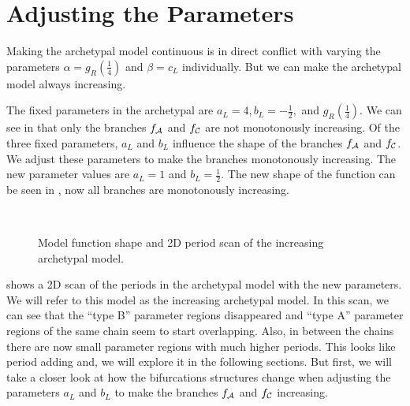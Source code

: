 \section{Adjusting the Parameters}
\label{sec:add.parameters}

Making the archetypal model continuous is in direct conflict with varying the parameters $\alpha = g_R\left(\frac{1}{4}\right)$ and $\beta = c_L$ individually.
But we can make the archetypal model always increasing.

The fixed parameters in the archetypal are $a_L = 4, b_L = -\frac{1}{2},$ and $g_R\left(\frac{1}{4}\right)$.
We can see in  that only the branches $f_{\mathcal{A}}$ and $f_{\mathcal{C}}$ are not monotonously increasing.
Of the three fixed parameters, $a_L$ and $b_L$ influence the shape of the branches $f_{\mathcal{A}}$ and $f_{\mathcal{C}}$.
We adjust these parameters to make the branches monotonously increasing.
The new parameter values are $a_L = 1$ and $b_L = \frac{1}{2}$.
The new shape of the function can be seen in , now all branches are monotonously increasing.

\begin{figure}
	\centering
	\\
	\caption[Model function shape and 2D period scan of the increasing archetypal model]{
		Model function shape and 2D period scan of the increasing archetypal model.
	}
\end{figure}

 shows a 2D scan of the periods in the archetypal model with the new parameters.
We will refer to this model as the increasing archetypal model.
In this scan, we can see that the ``type B'' parameter regions disappeared and ``type A'' parameter regions of the same chain seem to start overlapping.
Also, in between the chains there are now small parameter regions with much higher periods.
This looks like period adding and, we will explore it in the following sections.
But first, we will take a closer look at how the bifurcations structures change when adjusting the parameters $a_L$ and $b_L$ to make the branches $f_{\mathcal{A}}$ and $f_{\mathcal{C}}$ increasing.
